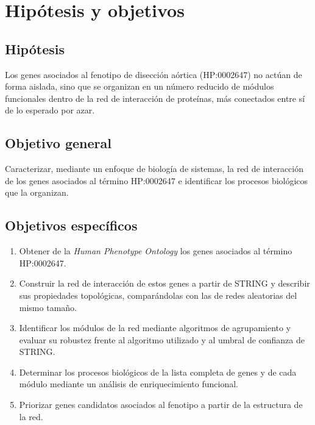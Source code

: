 \section{Hipótesis y objetivos}

\subsection*{Hipótesis}

Los genes asociados al fenotipo de disección aórtica (HP:0002647) no actúan de forma aislada, sino que se organizan en un número reducido de módulos funcionales dentro de la red de interacción de proteínas, más conectados entre sí de lo esperado por azar.

\subsection*{Objetivo general}

Caracterizar, mediante un enfoque de biología de sistemas, la red de interacción de los genes asociados al término HP:0002647 e identificar los procesos biológicos que la organizan.

\subsection*{Objetivos específicos}

\begin{enumerate}
	\item Obtener de la \textit{Human Phenotype Ontology} los genes asociados al término HP:0002647.
	\item Construir la red de interacción de estos genes a partir de STRING y describir sus propiedades topológicas, comparándolas con las de redes aleatorias del mismo tamaño.
	\item Identificar los módulos de la red mediante algoritmos de agrupamiento y evaluar su robustez frente al algoritmo utilizado y al umbral de confianza de STRING.
	\item Determinar los procesos biológicos de la lista completa de genes y de cada módulo mediante un análisis de enriquecimiento funcional.
	\item Priorizar genes candidatos asociados al fenotipo a partir de la estructura de la red.
\end{enumerate}